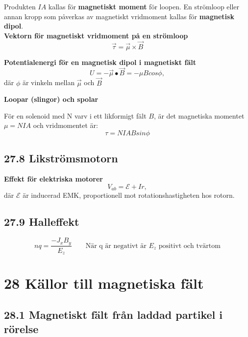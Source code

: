 \documentclass[a4paper]{article}
\begin{document}
Produkten $IA$ kallas för \textbf{magnetiskt moment} för loopen. En strömloop eller annan kropp som påverkas av magnetiskt vridmoment kallas för \textbf{magnetisk dipol}. \\

\textbf{Vektorn för magnetiskt vridmoment på en strömloop}
\begin{equation}
\vec{\tau} = \vec{\mu} \times \vec{B}
\end{equation}

\textbf{Potentialenergi för en magnetisk dipol i magnetiskt fält}
\begin{equation}
U = -\vec{\mu}  \bullet \vec{B} = - \mu B cos \phi, 
\end{equation}
där $\phi$ är vinkeln mellan $\vec{\mu}$ och $\vec{B}$

\textbf{Loopar (slingor) och spolar}

För en solenoid med N varv i ett likformigt fält $B$, är det magnetiska momentet $\mu = NIA$ och vridmomentet är: \\
\begin{equation}
\tau = NIABsin\phi
\end{equation}

\subsection*{27.8 Likströmsmotorn}

\textbf{Effekt för elektriska motorer}
\begin{equation}
V_{ab} = \mathcal{E} + Ir,
\end{equation}
där $\mathcal{E}$ är inducerad EMK, proportionell mot rotationshastigheten hos rotorn.

\newpage
\subsection*{27.9 Halleffekt}
\begin{equation}
nq = \dfrac{-J_xB_y}{E_z} \qquad \text{När q är negativt är $E_z$ positivt och tvärtom}
\end{equation}

\section*{28 Källor till magnetiska fält}

\subsection*{28.1 Magnetiskt fält från laddad partikel i rörelse}
\end{document}

